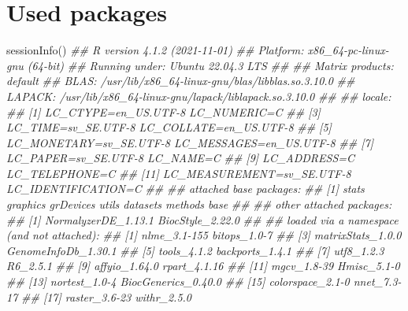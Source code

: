 \documentclass[]{article}
\newcommand{\hlcom}[1]{\textcolor[rgb]{0.502,0.502,0.502}{\textit{#1}}}%
\newcommand{\hlstd}[1]{\textcolor[rgb]{0.251,0.251,0.251}{#1}}%
\newenvironment{Shaded}{\begin{myshaded}}{\end{myshaded}}
\newcommand{\DocumentationTok}[1]{\hlcom{#1}}
\newcommand{\FunctionTok}[1]{\hlstd{#1}}
\newcommand{\NormalTok}[1]{\hlstd{#1}}
\begin{document}
\hypertarget{used-packages}{%
\section{Used packages}\label{used-packages}}

\begin{Shaded}
\begin{Highlighting}[]
\FunctionTok{sessionInfo}\NormalTok{()}
\DocumentationTok{\#\# R version 4.1.2 (2021{-}11{-}01)}
\DocumentationTok{\#\# Platform: x86\_64{-}pc{-}linux{-}gnu (64{-}bit)}
\DocumentationTok{\#\# Running under: Ubuntu 22.04.3 LTS}
\DocumentationTok{\#\# }
\DocumentationTok{\#\# Matrix products: default}
\DocumentationTok{\#\# BLAS:   /usr/lib/x86\_64{-}linux{-}gnu/blas/libblas.so.3.10.0}
\DocumentationTok{\#\# LAPACK: /usr/lib/x86\_64{-}linux{-}gnu/lapack/liblapack.so.3.10.0}
\DocumentationTok{\#\# }
\DocumentationTok{\#\# locale:}
\DocumentationTok{\#\#  [1] LC\_CTYPE=en\_US.UTF{-}8       LC\_NUMERIC=C              }
\DocumentationTok{\#\#  [3] LC\_TIME=sv\_SE.UTF{-}8        LC\_COLLATE=en\_US.UTF{-}8    }
\DocumentationTok{\#\#  [5] LC\_MONETARY=sv\_SE.UTF{-}8    LC\_MESSAGES=en\_US.UTF{-}8   }
\DocumentationTok{\#\#  [7] LC\_PAPER=sv\_SE.UTF{-}8       LC\_NAME=C                 }
\DocumentationTok{\#\#  [9] LC\_ADDRESS=C               LC\_TELEPHONE=C            }
\DocumentationTok{\#\# [11] LC\_MEASUREMENT=sv\_SE.UTF{-}8 LC\_IDENTIFICATION=C       }
\DocumentationTok{\#\# }
\DocumentationTok{\#\# attached base packages:}
\DocumentationTok{\#\# [1] stats     graphics  grDevices utils     datasets  methods   base     }
\DocumentationTok{\#\# }
\DocumentationTok{\#\# other attached packages:}
\DocumentationTok{\#\# [1] NormalyzerDE\_1.13.1 BiocStyle\_2.22.0   }
\DocumentationTok{\#\# }
\DocumentationTok{\#\# loaded via a namespace (and not attached):}
\DocumentationTok{\#\#   [1] nlme\_3.1{-}155                bitops\_1.0{-}7               }
\DocumentationTok{\#\#   [3] matrixStats\_1.0.0           GenomeInfoDb\_1.30.1        }
\DocumentationTok{\#\#   [5] tools\_4.1.2                 backports\_1.4.1            }
\DocumentationTok{\#\#   [7] utf8\_1.2.3                  R6\_2.5.1                   }
\DocumentationTok{\#\#   [9] affyio\_1.64.0               rpart\_4.1.16               }
\DocumentationTok{\#\#  [11] mgcv\_1.8{-}39                 Hmisc\_5.1{-}0                }
\DocumentationTok{\#\#  [13] nortest\_1.0{-}4               BiocGenerics\_0.40.0        }
\DocumentationTok{\#\#  [15] colorspace\_2.1{-}0            nnet\_7.3{-}17                }
\DocumentationTok{\#\#  [17] raster\_3.6{-}23               withr\_2.5.0                }

\end{Highlighting}
\end{Shaded}
\end{document}
